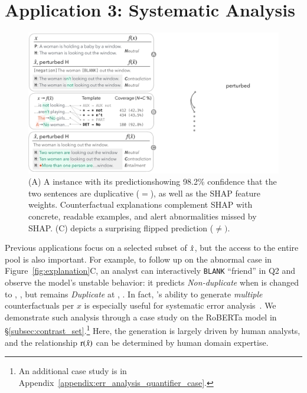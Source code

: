 \section{Application 3: Systematic Analysis}
\label{sec:app_err_analysis}


\begin{figure}[t]
\centering
\includegraphics[trim={0 0.5cm 33cm 0cm},clip,width=1\columnwidth]{figures/err_analysis.pdf}
\vspace{-15pt}
\caption{
(A) A \qqp instance with its prediction\footnotemark showing 98.2\% confidence that the two sentences are duplicative ($=$), as well as the SHAP feature weights.
Counterfactual explanations complement SHAP with concrete, readable examples, and alert abnormalities missed by SHAP. \eg (C)
depicts a surprising flipped prediction ($\neq)$.
}
\vspace{-10pt}
\label{fig:err_analysis}
\end{figure}


Previous applications focus on a selected subset of $\hat{x}$, but the access to the entire pool is also important.
For example, to follow up on the abnormal case in Figure~\ref{fig:explanation}C, an analyst can interactively \texttt{BLANK} ``friend'' in Q2 and observe the model's unstable behavior: it predicts \emph{Non-duplicate} when  is changed to , , but remains \emph{Duplicate} at , .
In fact, \sysname's ability to generate \emph{multiple} counterfactuals per $x$ is especially useful for systematic error analysis~\cite{wu2019errudite}.
We demonstrate such analysis through a case study on the \nli RoBERTa model in \S\ref{subsec:contrast_set}.\footnote{An additional case study is in Appendix~\ref{appendix:err_analysis_quantifier_case}.}
Here, the generation is largely driven by human analysts, and the relationship $\operatorname*{r}(\hat{x})$ can be determined by human domain expertise.

